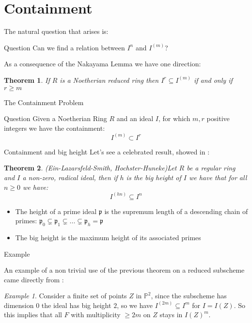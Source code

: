\documentclass{beamer}
\theoremstyle{plain}
\newtheorem{teo}{Theorem}[section]
\theoremstyle{remark}
\newtheorem{ex}[rem]{Example}
\theoremstyle{definition}
\newcommand{\PP}{\mathbb{P}}
\newcommand{\p}{\mathfrak{p}}
\newcommand{\cont}[2]{ I^{(#1)} \subseteq I^{#2}}
\begin{document}
\section{Containment}

\begin{frame}
The natural question that arises is:
\begin{alertblock}{Question}
Can we find a relation between $ I^n $ and $ I^{(m)} $?
\end{alertblock}
\pause 
As a consequence of the Nakayama Lemma we have one direction:
\begin{teo}\label{teo:inv_cont}
	If $ R $ is a Noetherian reduced ring then $ I^r \subseteq I^{(m)}$  if and only if $ r \geq m $
\end{teo}
\end{frame}

\begin{frame}{The Containment Problem}
\begin{alertblock}{Question}
Given a Noetherian Ring $ R $ and an ideal $ I $, for which $ m,r $ positive integers we have the containment:
		$$ I^{(m)} \subset I^r $$
\end{alertblock}
\end{frame}

\begin{frame}{Containment and big height}
Let's see a celebrated result, showed in \cite{HocHun02,EinLazSmi01}:
	\begin{teo}{(Ein-Lazarsfeld-Smith, Hochster-Huneke)}\label{teo:cont:bigh}
	Let $ R $ be a regular ring and $ I $ a non-zero, radical ideal, then if $ h $ is the big height of $ I $ we have that for all $ n \geq 0 $ we have:
	\[ \cont{hn}{n}\]	
	\end{teo} 
\pause
\begin{itemize}
\item The height of a prime ideal $ \p $ is the supremum length of a descending chain of primes: $ \p_0 \subsetneq \p_1 \subsetneq ... \subsetneq \p_{h} = \p $
\item The big height is the maximum height of its associated primes
\end{itemize}
\end{frame}



\begin{frame}{Example}

An example of a non trivial use of the previous theorem on a reduced subscheme came directly from \cite[2.3]{EinLazSmi01}:
	
	\begin{ex}\label{es:P2points}
	Consider a finite set of points $ Z $ in $ \PP^2 $, since the subscheme has dimension $ 0 $ the ideal has big height $ 2 $, so we have $ \cont{2m}{m} $ for $ I = I(Z) $. So this implies that all $ F $ with multiplicity $ \geq 2m $ on $ Z $ stays in $ I(Z)^m $. 
	\end{ex}
\end{frame}
\end{document}

